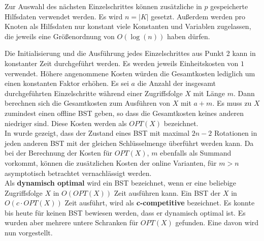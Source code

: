 \documentclass[a4paper,12pt]{article}
\begin{document}
\noindent 	Zur Auswahl des nächsten Einzelschrittes können zusätzliche in $p$ gespeicherte Hilfsdaten verwendet werden. Es wird $n = \vert K \vert$ gesetzt. Außerdem werden pro Knoten als Hilfsdaten nur konstant viele Konstanten und Variablen zugelassen, die jeweils eine Größenordnung von $O\left(\log \left(n\right)\right)$  haben dürfen.

\noindent Die Initialisierung und die Ausführung jedes Einzelschrittes aus Punkt 2 kann in konstanter Zeit durchgeführt werden. Es werden jeweils Einheitskosten von $1$ verwendet. Höhere angenommene Kosten würden die Gesamtkosten lediglich um einen konstanten Faktor erhöhen. Es sei $a$ die Anzahl der insgesamt durchgeführten Einzelschritte während einer Zugriffsfolge $X$ mit Länge $m$. Dann berechnen sich die Gesamtkosten zum Ausführen von $X$ mit $a + m$. Es muss zu $X$ zumindest einen offline BST geben, so dass die Gesamtkosten keines anderen niedriger sind. Diese Kosten werden als \textbf{$\mathit{OPT\left(X\right)}$} bezeichnet.\\  In \cite{nRotations} wurde gezeigt, dass der Zustand eines BST mit maximal $2n -2$ Rotationen in jeden anderen BST mit der gleichen Schlüsselmenge überführt werden kann. Da bei der Berechnung der Kosten für  $\mathit{OPT(X)}$, $m$ ebenfalls als Summand vorkommt, können die zusätzlichen Kosten der online Varianten, für $m > n$ asymptotisch betrachtet vernachlässigt werden. \\
\noindent Als \textbf{dynamisch optimal } wird ein BST bezeichnet, wenn er eine beliebige Zugriffsfolge $X$ in $O\left(\mathit{OPT}\left(X\right)\right)$ Zeit ausführen kann. Ein BST der $X$ in $O\left(c \cdot \mathit{OPT}\left(X\right)\right)$ Zeit ausführt, wird als \textbf{c-competitive} bezeichnet. Es konnte bis heute für keinen BST bewiesen werden, dass er dynamisch optimal ist. Es wurden aber mehrere untere Schranken für $\mathit{OPT}\left(X\right)$ gefunden. Eine davon wird  nun vorgestellt.
\end{document}
